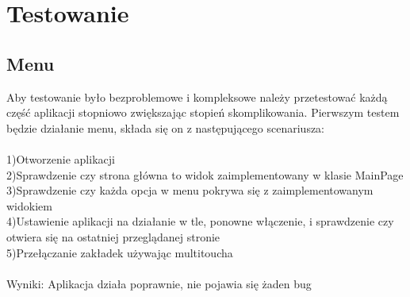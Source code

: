 	\newpage
\section{Testowanie}	%
\subsection{Menu} %
Aby testowanie było bezproblemowe i kompleksowe należy przetestować każdą część aplikacji stopniowo zwiększając stopień skomplikowania. Pierwszym testem będzie działanie menu, składa się on z następującego scenariusza:\\\\
1)Otworzenie aplikacji\\
2)Sprawdzenie czy strona główna to widok zaimplementowany w klasie MainPage\\
3)Sprawdzenie czy każda opcja w menu pokrywa się z zaimplementowanym widokiem\\
4)Ustawienie aplikacji na działanie w tle, ponowne włączenie, i sprawdzenie czy otwiera się na ostatniej przeglądanej stronie\\
5)Przełączanie zakładek używając multitoucha\\\\
Wyniki: Aplikacja działa poprawnie, nie pojawia się żaden bug\\

